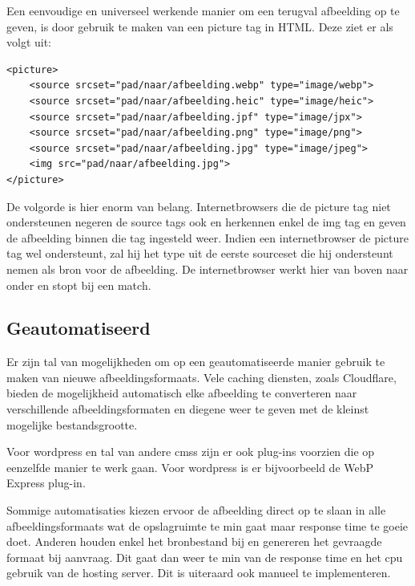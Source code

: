 Een eenvoudige en universeel werkende manier om een terugval afbeelding op te geven, is door gebruik te maken van een picture tag in HTML. Deze ziet er als volgt uit:

\begin{lstlisting}[style=htmlcssjs]
<picture>
	<source srcset="pad/naar/afbeelding.webp" type="image/webp">
	<source srcset="pad/naar/afbeelding.heic" type="image/heic">
	<source srcset="pad/naar/afbeelding.jpf" type="image/jpx">
	<source srcset="pad/naar/afbeelding.png" type="image/png"> 
	<source srcset="pad/naar/afbeelding.jpg" type="image/jpeg"> 
	<img src="pad/naar/afbeelding.jpg">
</picture>
\end{lstlisting}

De volgorde is hier enorm van belang. Internetbrowsers die de picture tag niet ondersteunen negeren de source tags ook en herkennen enkel de img tag en geven de afbeelding binnen die tag ingesteld weer. Indien een internetbrowser de picture tag wel ondersteunt, zal hij het type uit de eerste sourceset die hij ondersteunt nemen als bron voor de afbeelding. De internetbrowser werkt hier van boven naar onder en stopt bij een match.

\subsection{Geautomatiseerd}
\label{sec:afbeeldingscompressie-implementatie-web-automated}

Er zijn tal van mogelijkheden om op een geautomatiseerde manier gebruik te maken van nieuwe \glspl{afbeeldingsformaat}. Vele caching diensten, zoals Cloudflare, bieden de mogelijkheid automatisch elke afbeelding te converteren naar verschillende afbeeldingsformaten en diegene weer te geven met de kleinst mogelijke bestandsgrootte. 

Voor \gls{wordpress} en tal van andere \glspl{cms} zijn er ook \glspl{plug-in} voorzien die op eenzelfde manier te werk gaan. Voor \gls{wordpress} is er bijvoorbeeld de WebP Express  \gls{plug-in}.

Sommige automatisaties kiezen ervoor de afbeelding direct op te slaan in alle \glspl{afbeeldingsformaat} wat de opslagruimte te min gaat maar response time te goeie doet. Anderen houden enkel het bronbestand bij en genereren het gevraagde formaat bij aanvraag. Dit gaat dan weer te min van de response time en het cpu gebruik van de \gls{hosting} server. Dit is uiteraard ook manueel te implementeren.

